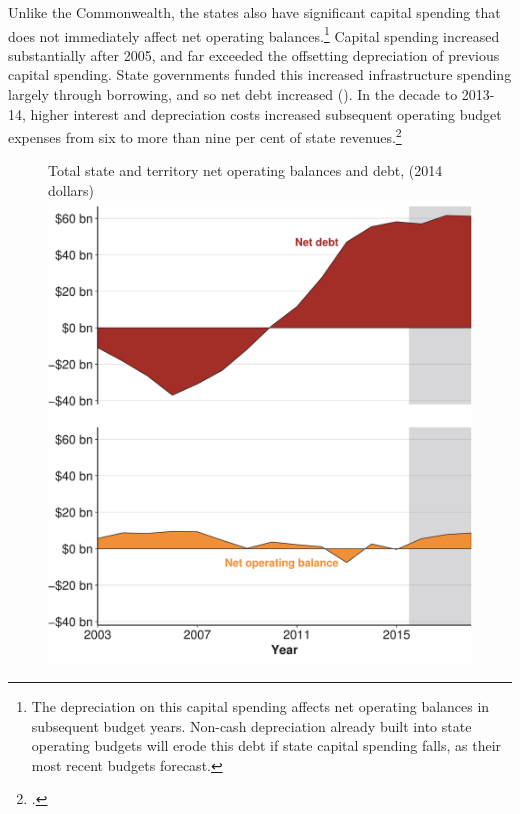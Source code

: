 Unlike the Commonwealth, the states also have significant capital spending that does not immediately affect net operating balances.\footnote{The depreciation on this capital spending affects net operating balances in subsequent budget years. Non-cash depreciation already built into state operating budgets will erode this debt if state capital spending falls, as their most recent budgets forecast.}  Capital spending increased substantially after 2005, and far exceeded the offsetting depreciation of previous capital spending. State governments funded this increased infrastructure spending largely through borrowing, and so net debt increased (). In the decade to 2013-14, higher interest and depreciation costs increased subsequent operating budget expenses from six to more than nine per cent of state revenues.\footcite[][41]{DaleyWoodWeidmannEtAl2014}

\begin{figure} 
%
{Total state and territory net operating balances and debt, (2014 dollars)}
\includegraphics[width=\columnwidth]{Fiscal-challenges/figure/Figure12-1.pdf}

\end{figure} 


